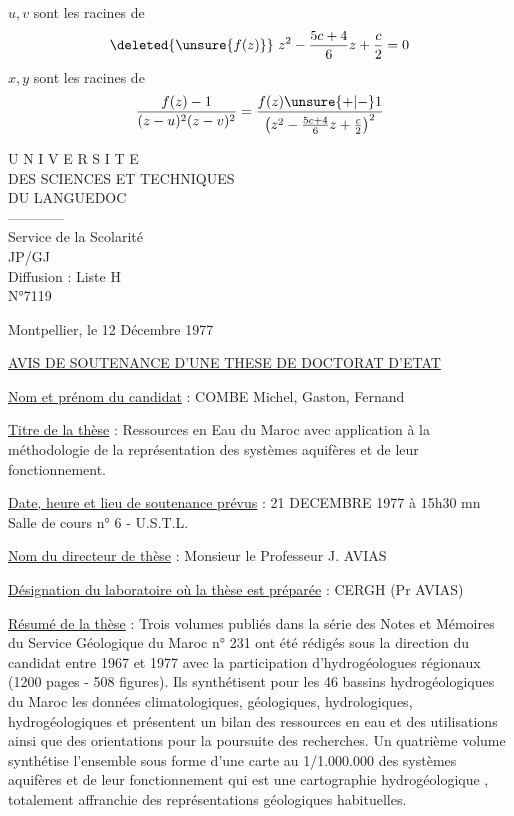 $u,v$ sont les racines de
\[\deleted{\unsure{f(z)}}\ z^2-\frac{5c+4}{6}z+\frac c2=0\]
$x,y$ sont les racines de
\[
\frac{f(z)-1}{(z-u)^2(z-v)^2}=\frac{f(z)\unsure{+|-}1}{\left(z^2-\frac{5c+4}{6}z+\frac c2\right)^2}
\]

\begin{center}
U N I V E R S I T E\\
DES SCIENCES ET TECHNIQUES\\
DU LANGUEDOC\\
------------\\
Service de la Scolarité\\
JP/GJ\\
Diffusion : Liste H\\
N°7119
\end{center}
Montpellier, le 12 Décembre 1977

\uline{AVIS DE SOUTENANCE D'UNE THESE DE DOCTORAT D'ETAT}

\uline{Nom et prénom du candidat} : COMBE Michel, Gaston, Fernand

\uline{Titre de la thèse} : Ressources en Eau du Maroc avec application à la méthodologie de la représentation des systèmes aquifères et de leur fonctionnement.

\uline{Date, heure et lieu de soutenance prévus} : 21 DECEMBRE 1977 à 15h30 mn\\
Salle de cours n° 6 - U.S.T.L.

\uline{Nom du directeur de thèse} : Monsieur le Professeur J. AVIAS

\uline{Désignation du laboratoire où la thèse est préparée} : CERGH (Pr AVIAS)

\uline{Résumé de la thèse} : Trois volumes publiés dans la série des Notes et Mémoires du Service Géologique du Maroc n° 231 ont été rédigés sous la direction du candidat entre 1967 et 1977 avec la participation d'hydrogéologues régionaux (1200 pages - 508 figures). Ils synthétisent pour les 46 bassins hydrogéologiques du Maroc les données climatologiques, géologiques, hydrologiques, hydrogéologiques et présentent un bilan des ressources en eau et des utilisations ainsi que des orientations pour la poursuite des recherches. Un quatrième volume synthétise l'ensemble sous forme d'une carte au 1/1.000.000 des systèmes aquifères et de leur fonctionnement qui est une cartographie hydrogéologique , totalement affranchie des représentations géologiques habituelles.

